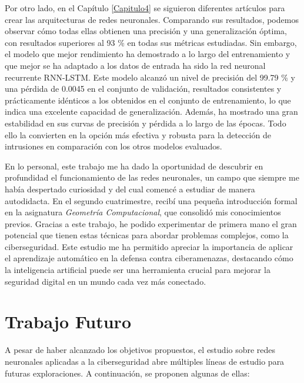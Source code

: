 Por otro lado, en el Capítulo \ref{Capitulo4} se siguieron diferentes artículos para crear las arquitecturas de redes neuronales. Comparando sus resultados, podemos observar cómo todas ellas obtienen una precisión y una generalización óptima, con resultados superiores al 93 \% en todas sus métricas estudiadas. Sin embargo, el modelo que mejor rendimiento ha demostrado a lo largo del entrenamiento y que mejor se ha adaptado a los datos de entrada ha sido la red neuronal recurrente RNN-LSTM. Este modelo alcanzó un nivel de precisión del 99.79 \% y una pérdida de 0.0045 en el conjunto de validación, resultados consistentes y prácticamente idénticos a los obtenidos en el conjunto de entrenamiento, lo que indica una excelente capacidad de generalización. Además, ha mostrado una gran estabilidad en sus curvas de precisión y pérdida a lo largo de las épocas. Todo ello la convierten en la opción más efectiva y robusta para la detección de intrusiones en comparación con los otros modelos evaluados. 


En lo personal, este trabajo me ha dado la oportunidad de descubrir en profundidad el funcionamiento de las redes neuronales, un campo que siempre me había despertado curiosidad y del cual comencé a estudiar de manera autodidacta. En el segundo cuatrimestre, recibí una pequeña introducción formal en la asignatura \textit{Geometría Computacional}, que consolidó mis conocimientos previos. Gracias a este trabajo, he podido experimentar de primera mano el gran potencial que tienen estas técnicas para abordar problemas complejos, como la ciberseguridad. Este estudio me ha permitido apreciar la importancia de aplicar el aprendizaje automático en la defensa contra ciberamenazas, destacando cómo la inteligencia artificial puede ser una herramienta crucial para mejorar la seguridad digital en un mundo cada vez más conectado.

\section{Trabajo Futuro}

A pesar de haber alcanzado los objetivos propuestos, el estudio sobre redes neuronales aplicadas a la ciberseguridad abre múltiples líneas de estudio para futuras exploraciones. A continuación, se proponen algunas de ellas:

